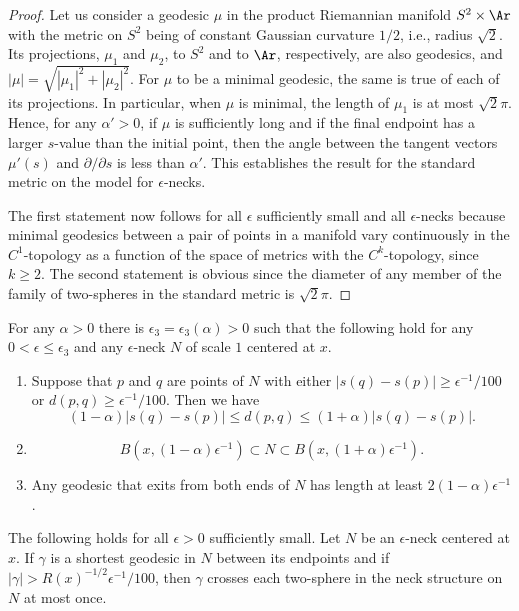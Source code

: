 \begin{proof}
Let us consider a geodesic $\mu$ in the product Riemannian manifold
$S^2\times \Ar$ with the metric on $S^2$ being of constant Gaussian
curvature $1/2$, i.e., radius $\sqrt{2}$. Its projections, $\mu_1$
and $\mu_2$, to $S^2$ and to $\Ar$, respectively,
 are also geodesics, and $|\mu|=\sqrt{|\mu_1|^2+|\mu_2|^2}$.
 For $\mu$ to be a minimal geodesic, the same is true of each of its projections.
In particular, when $\mu$ is minimal, the length of $\mu_1$ is at
most $\sqrt{2}\pi$. Hence, for any $\alpha'>0$, if $\mu$ is
sufficiently long and if the final endpoint has a larger $s$-value
than the initial point, then the angle between the tangent vectors
$\mu'(s)$ and $\partial/\partial s$ is less than $\alpha'$. This
establishes the result for the standard metric on the model for
$\epsilon$-necks.

The first statement now follows for all $\epsilon$ sufficiently
small and all $\epsilon$-necks because minimal geodesics between a
pair of points in a manifold vary continuously in the $C^1$-topology
as a function of the space of metrics with the $C^k$-topology, since
$k\ge 2$. The second statement is obvious since the diameter of any
member of the family of two-spheres in the standard metric is
$\sqrt{2}\pi$.
\end{proof}


\begin{corollary}
\label{cor:neck-distance-estimates}
\label{neckgeo}
For any $\alpha>0$ there is $\epsilon_3=\epsilon_3(\alpha)>0$ such
that the  following hold for any $0<\epsilon\le \epsilon_3$ and any
$\epsilon$-neck $N$ of scale $1$ centered at $x$.
\begin{enumerate}
\item[(1)] Suppose that $p$ and $q$ are points of  $N$
with either $|s(q)-s(p)|\ge \epsilon^{-1}/100$ or $d(p,q)\ge
\epsilon^{-1}/100$. Then  we have
$$(1-\alpha)|s(q)-s(p)|\le d(p,q)\le (1+\alpha)|s(q)-s(p)|.$$
\item[(2)]
$$B(x,(1-\alpha)\epsilon^{-1})\subset
N\subset B(x,(1+\alpha)\epsilon^{-1}).$$
\item[(3)] Any geodesic that exits from both ends of $N$ has length at least $2(1-\alpha)
\epsilon^{-1}$.\end{enumerate}
\end{corollary}



\begin{corollary}
\label{cor:shortest-geodesic-crosses-neck-once}
\label{compint}
The following holds for all $\epsilon>0$ sufficiently small. Let $N$
be an $\epsilon$-neck centered at $x$. If $\gamma$ is a shortest
geodesic in $N$ between its endpoints and if
$|\gamma|>R(x)^{-1/2}\epsilon^{-1}/100$, then $\gamma$ crosses each
two-sphere in the neck structure on $N$ at most once.
\end{corollary}






